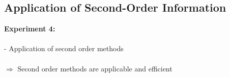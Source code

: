 \documentclass[11pt, a4paper]{article}
\begin{document}
\subsection{Application of Second-Order Information}

\textbf{Experiment 4:} \\
\ \\
- Application of second order methods \\
\ \\
$\Rightarrow$ Second order methods are applicable and efficient \\
\ \\

\pagebreak

\end{document}
